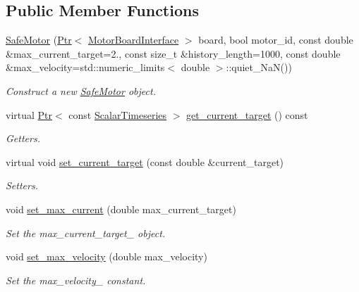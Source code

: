 \subsection*{Public Member Functions}
\begin{DoxyCompactItemize}
\item 
\hyperlink{classblmc__drivers_1_1SafeMotor_a6e9cda054c161d28f062955d97e73f82}{Safe\+Motor} (\hyperlink{classblmc__drivers_1_1MotorInterface_ae31f230b9da3674a05543023c90b124c}{Ptr}$<$ \hyperlink{classblmc__drivers_1_1MotorBoardInterface}{Motor\+Board\+Interface} $>$ board, bool motor\+\_\+id, const double \&max\+\_\+current\+\_\+target=2., const size\+\_\+t \&history\+\_\+length=1000, const double \&max\+\_\+velocity=std\+::numeric\+\_\+limits$<$ double $>$\+::quiet\+\_\+\+NaN())
\begin{DoxyCompactList}\small\item\em Construct a new \hyperlink{classblmc__drivers_1_1SafeMotor}{Safe\+Motor} object. \end{DoxyCompactList}\item 
virtual \hyperlink{classblmc__drivers_1_1MotorInterface_ae31f230b9da3674a05543023c90b124c}{Ptr}$<$ const \hyperlink{classblmc__drivers_1_1MotorInterface_a49b8fc916b9f9debbd7b0988463db5cd}{Scalar\+Timeseries} $>$ \hyperlink{classblmc__drivers_1_1SafeMotor_ae40e4c51272c46f037ea0ba393b2033e}{get\+\_\+current\+\_\+target} () const
\begin{DoxyCompactList}\small\item\em Getters. \end{DoxyCompactList}\item 
virtual void \hyperlink{classblmc__drivers_1_1SafeMotor_adedaee24408b94b3d1ed8f856e218b12}{set\+\_\+current\+\_\+target} (const double \&current\+\_\+target)
\begin{DoxyCompactList}\small\item\em Setters. \end{DoxyCompactList}\item 
void \hyperlink{classblmc__drivers_1_1SafeMotor_ad4f4bb531e2a9e7f965b319afb53d43c}{set\+\_\+max\+\_\+current} (double max\+\_\+current\+\_\+target)
\begin{DoxyCompactList}\small\item\em Set the max\+\_\+current\+\_\+target\+\_\+ object. \end{DoxyCompactList}\item 
void \hyperlink{classblmc__drivers_1_1SafeMotor_aaa0083a39d815d7b3cd38c680bfea48a}{set\+\_\+max\+\_\+velocity} (double max\+\_\+velocity)
\begin{DoxyCompactList}\small\item\em Set the max\+\_\+velocity\+\_\+ constant. \end{DoxyCompactList}\end{DoxyCompactItemize}
